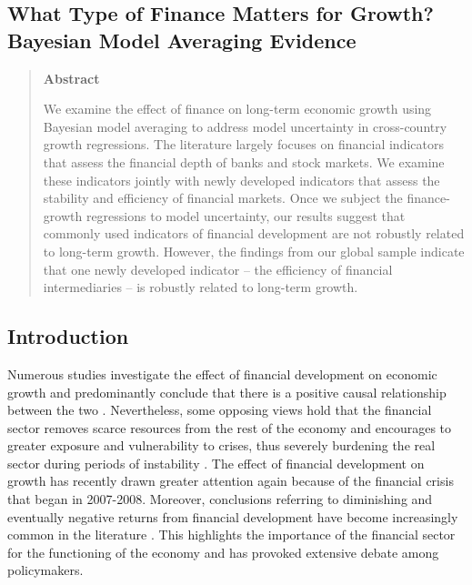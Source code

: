 \begin{refsection}
\chapter{What Type of Finance Matters for Growth? Bayesian Model Averaging Evidence}
\label{ch2}

\begin{quote}
\begin{center}\textbf{Abstract}\end{center}
	We examine the effect of finance on long-term economic growth using Bayesian model averaging to address model uncertainty in cross-country growth regressions. The literature largely focuses on financial indicators that assess the financial depth of banks and stock markets. We examine these indicators jointly with newly developed indicators that assess the stability and efficiency of financial markets. Once we subject the finance-growth regressions to model uncertainty, our results suggest that commonly used indicators of financial development are not robustly related to long-term growth. However, the findings from our global sample indicate that one newly developed indicator -- the efficiency of financial intermediaries -- is robustly related to long-term growth.     
	\end{quote}

\clearpage
\section{Introduction}
\label{ch2sec:intro}
Numerous studies investigate the effect of financial development on economic growth and predominantly conclude that there is a positive causal relationship between the two \parencite{KingLevine1993a, LevineZervos1998, AtjeJovanovich1993}. Nevertheless, some opposing views hold that the financial sector removes scarce resources from the rest of the economy \parencite{Tobin1984,Boltonetal2011} and encourages to greater exposure and vulnerability to crises, thus severely burdening the real sector during periods of instability \parencite{Kindelberger1978,Minsky1991,Stiglitz2000}. The effect of financial development on growth has recently drawn greater attention again because of the financial crisis that began in 2007-2008. Moreover, conclusions referring to diminishing and eventually negative returns from financial development have become increasingly common in the literature \parencite{Arcandetal2012,CecchettiKharroubi2012,LawSingh2014}. This highlights the importance of the financial sector for the functioning of the economy and has provoked extensive debate among policymakers. 


\end{refsection}
